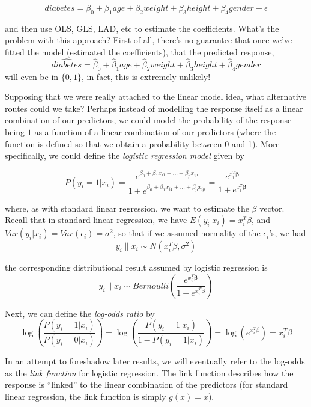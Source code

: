 $$diabetes = \beta_0 + \beta_1 age + \beta_2 weight + \beta_3 height + \beta_4 gender + \epsilon$$

and then use OLS, GLS, LAD, etc to estimate the coefficients. What's the problem with this approach? First of all, there's no guarantee that once we've fitted the model (estimated the coefficients), that the predicted response, 
$$\widehat{diabetes} = \hat{\beta}_0 + \hat{\beta}_1 age + \hat{\beta}_2 weight + \hat{\beta}_3 height + \hat{\beta}_4 gender$$
will even be in $\{0, 1\}$, in fact, this is extremely unlikely!

Supposing that we were really attached to the linear model idea, what alternative routes could we take? Perhaps instead of modelling the response itself as a linear combination of our predictors, we could model the probability of the response being $1$ as a function of a linear combination of our predictors (where the function is defined so that we obtain a probability between 0 and 1). More specifically, we could define the \textit{logistic regression model} given by

$$P(y_i = 1 | x_i) = \frac{e^{\beta_0 + \beta_1x_{i1} + ... + \beta_px_{ip}} }{1 + e^{\beta_0 + \beta_1x_{i1} + ... + \beta_px_{ip}}} = \frac{e^{x_i^T \boldsymbol{\beta}} }{1 + e^{x_i^T \boldsymbol{\beta}}}$$

where, as with standard linear regression, we want to estimate the $\beta$ vector. Recall that in standard linear regression, we have $E(y_i | x_i) = x_i^T\beta$, and $Var(y_i | x_i) = Var(\epsilon_i) = \sigma^2$, so that if we assumed normality of the $\epsilon_i$'s, we had 
$$y_i \| x_i \sim N(x_i^T\beta, \sigma^2)$$

the corresponding distributional result assumed by logistic regression is
$$y_i \| x_i \sim Bernoulli\left(\frac{e^{x_i^T \boldsymbol{\beta}} }{1 + e^{x_i^T \boldsymbol{\beta}}}\right)$$


Next, we can define the \textit{log-odds ratio} by
$$\log \left(\frac{P(y_i = 1 | x_i)}{P(y_i = 0 | x_i)} \right) = \log  \left(\frac{P(y_i = 1 | x_i)}{1 - P(y_i = 1 | x_i)} \right) = \log \left( e^{x_i^T \beta} \right) = x_i^T \beta$$

In an attempt to foreshadow later results, we will eventually refer to the log-odds as the \textit{link function} for logistic regression. The link function describes how the response is ``linked'' to the linear combination of the predictors (for standard linear regression, the link function is simply $g(x) = x$).



